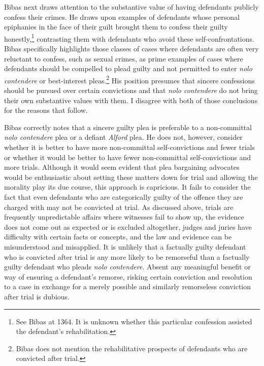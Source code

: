 Bibas next draws attention to the substantive value of having defendants publicly confess their crimes. He draws upon examples of defendants whose personal epiphanies in the face of their guilt brought them to confess their guilty honestly,\footnote{See Bibas at 1364. It is unknown whether this particular confession assisted the defendant's rehabilitation.} contrasting them with defendants who avoid these self-confrontations. Bibas specifically highlights those classes of cases where defendants are often very reluctant to confess, such as sexual crimes, as prime examples of cases where defendants should be compelled to plead guilty and not permitted to enter \textit{nolo contendere} or best-interest pleas.\footnote{Bibas does not mention the rehabilitative prospects of defendants who are convicted after trial.} His position presumes that sincere confessions should be pursued over certain convictions and that \textit{nolo contendere} do not bring their own substantive values with them. I disagree with both of those conclusions for the reasons that follow.

Bibas correctly notes that a sincere guilty plea is preferable to a non-committal \textit{nolo contendere} plea or a defiant \textit{Alford} plea. He does not, however, consider whether it is better to have more non-committal self-convictions and fewer trials or whether it would be better to have fewer non-committal self-convictions and more trials. Although it would seem evident that plea bargaining advocates would be enthusiastic about setting these matters down for trial and allowing the morality play its due course, this approach is capricious. It fails to consider the fact that even defendants who are categorically guilty of the offence they are charged with may not be convicted at trial. As discussed above, trials are frequently unpredictable affairs where witnesses fail to show up, the evidence does not come out as expected or is excluded altogether, judges and juries have difficulty with certain facts or concepts, and the law and evidence can be misunderstood and misapplied. It is unlikely that a factually guilty defendant who is convicted after trial is any more likely to be remorseful than a factually guilty defendant who pleads \textit{nolo contendere}. Absent any meaningful benefit or way of ensuring a defendant's remorse, risking certain conviction and resolution to a case in exchange for a merely possible and similarly remorseless conviction after trial is dubious. 

